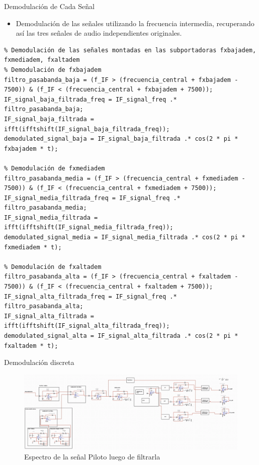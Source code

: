 \documentclass[mathserif,spanish]{beamer}
\begin{document}
\begin{frame}{Demodulación de Cada Señal}
    \begin{itemize}
        \item Demodulación de las señales utilizando la frecuencia intermedia, recuperando así las tres señales de audio independientes originales.
    \end{itemize}
    \begin{tcolorbox}[colback=yellow!5!white, colframe=yellow!75!black, title=Demodulación de Cada Señal, fonttitle=\normalsize, fontupper=\normalsize]
\begin{lstlisting}
% Demodulación de las señales montadas en las subportadoras fxbajadem, fxmediadem, fxaltadem
% Demodulación de fxbajadem
filtro_pasabanda_baja = (f_IF > (frecuencia_central + fxbajadem - 7500)) & (f_IF < (frecuencia_central + fxbajadem + 7500));
IF_signal_baja_filtrada_freq = IF_signal_freq .* filtro_pasabanda_baja;
IF_signal_baja_filtrada = ifft(ifftshift(IF_signal_baja_filtrada_freq));
demodulated_signal_baja = IF_signal_baja_filtrada .* cos(2 * pi * fxbajadem * t);

% Demodulación de fxmediadem
filtro_pasabanda_media = (f_IF > (frecuencia_central + fxmediadem - 7500)) & (f_IF < (frecuencia_central + fxmediadem + 7500));
IF_signal_media_filtrada_freq = IF_signal_freq .* filtro_pasabanda_media;
IF_signal_media_filtrada = ifft(ifftshift(IF_signal_media_filtrada_freq));
demodulated_signal_media = IF_signal_media_filtrada .* cos(2 * pi * fxmediadem * t);

% Demodulación de fxaltadem
filtro_pasabanda_alta = (f_IF > (frecuencia_central + fxaltadem - 7500)) & (f_IF < (frecuencia_central + fxaltadem + 7500));
IF_signal_alta_filtrada_freq = IF_signal_freq .* filtro_pasabanda_alta;
IF_signal_alta_filtrada = ifft(ifftshift(IF_signal_alta_filtrada_freq));
demodulated_signal_alta = IF_signal_alta_filtrada .* cos(2 * pi * fxaltadem * t);
\end{lstlisting}
    \end{tcolorbox}
\end{frame}

\begin{frame}{Demodulación discreta}

    \begin{figure}[h]
        \centering
        \includegraphics[scale=0.25]{mulsis_demod.png}
        \caption{Espectro de la señal Piloto luego de filtrarla}
    \end{figure}

\end{frame}
\end{document}
